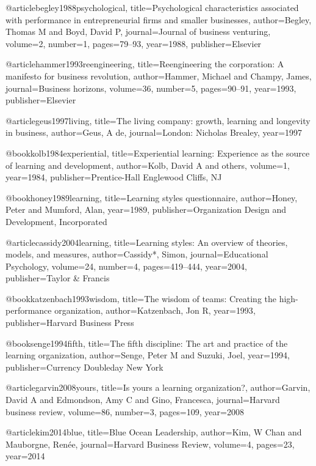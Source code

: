 @article{begley1988psychological,
  title={Psychological characteristics associated with performance in entrepreneurial firms and smaller businesses},
  author={Begley, Thomas M and Boyd, David P},
  journal={Journal of business venturing},
  volume={2},
  number={1},
  pages={79--93},
  year={1988},
  publisher={Elsevier}
}

@article{hammer1993reengineering,
  title={Reengineering the corporation: A manifesto for business revolution},
  author={Hammer, Michael and Champy, James},
  journal={Business horizons},
  volume={36},
  number={5},
  pages={90--91},
  year={1993},
  publisher={Elsevier}
}

@article{geus1997living,
  title={The living company: growth, learning and longevity in business},
  author={Geus, A de},
  journal={London: Nicholas Brealey},
  year={1997}
}

@book{kolb1984experiential,
  title={Experiential learning: Experience as the source of learning and development},
  author={Kolb, David A and others},
  volume={1},
  year={1984},
  publisher={Prentice-Hall Englewood Cliffs, NJ}
}

@book{honey1989learning,
  title={Learning styles questionnaire},
  author={Honey, Peter and Mumford, Alan},
  year={1989},
  publisher={Organization Design and Development, Incorporated}
}

@article{cassidy2004learning,
  title={Learning styles: An overview of theories, models, and measures},
  author={Cassidy*, Simon},
  journal={Educational Psychology},
  volume={24},
  number={4},
  pages={419--444},
  year={2004},
  publisher={Taylor \& Francis}
}

@book{katzenbach1993wisdom,
  title={The wisdom of teams: Creating the high-performance organization},
  author={Katzenbach, Jon R},
  year={1993},
  publisher={Harvard Business Press}
}

@book{senge1994fifth,
  title={The fifth discipline: The art and practice of the learning organization},
  author={Senge, Peter M and Suzuki, Joel},
  year={1994},
  publisher={Currency Doubleday New York}
}

@article{garvin2008yours,
  title={Is yours a learning organization?},
  author={Garvin, David A and Edmondson, Amy C and Gino, Francesca},
  journal={Harvard business review},
  volume={86},
  number={3},
  pages={109},
  year={2008}
}

@article{kim2014blue,
  title={Blue Ocean Leadership},
  author={Kim, W Chan and Mauborgne, Ren{\'e}e},
  journal={Harvard Business Review},
  volume={4},
  pages={23},
  year={2014}
}

